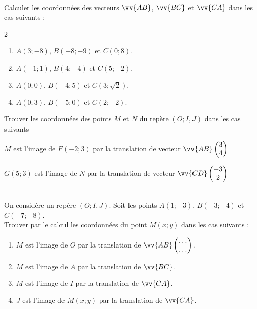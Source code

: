 \documentclass[main.tex]{subfiles}
\begin{document}
\begin{exercise}\label{chapter06:exercice:vecteurscoordonnees}\hfill \\ 
	Calculer les coordonnées des vecteurs $\vv{AB}$, $\vv{BC}$ et $\vv{CA}$  dans les cas suivants :
	\begin{multicols}{2}
		\begin{enumerate}[leftmargin=*,label=\alph*)]
			\item $A(3;-8)$, $B(-8;-9)$ et $C(0;8)$.
			\item $A(-1;1)$, $B(4;-4)$ et $C(5;-2)$.
			\item $A(0;0)$, $B(-4;5)$ et $C(3;\sqrt{2})$.
			\item $A(0;3)$, $B(-5;0)$ et $C(2;-2)$.
		\end{enumerate}
	\end{multicols}
\end{exercise}
\begin{example}Trouver les coordonnées des points $M$ et $N$ du repère $(O;I,J)$ dans les cas suivants\hfill \smallskip
	
	\noindent\parbox{0.47\linewidth}{
		$M$ est l'image de $F(-2;3)$ par la translation de vecteur $\vv{AB}\begin{pmatrix}
			3\\4
		\end{pmatrix}$
	}
	\hfill 
	\parbox{0.47\linewidth}{
		$G(5;3)$ est l'image de $N$ par la translation de vecteur $\vv{CD}\begin{pmatrix}
			-3\\2
		\end{pmatrix}$
	}	
	
	\vfill 
	
\end{example}

\begin{exercise}\label{chapter06:exercice:translationcoordonnees}\hfill \\
	On considère un repère $(O;I,J)$. Soit les points $A(1;-3)$, $B(-3;-4)$ et $C(-7;-8)$. \\
	Trouver par le calcul les coordonnées du point $M(x;y)$ dans les cas suivants : 
	\begin{enumerate}[leftmargin=*,label=\alph*)] 
		\item $M$ est l'image de $O$ par la translation de $\vv{AB}\begin{pmatrix}
			\ldots \\ \ldots
		\end{pmatrix}$. 
		\item $M$ est l'image de $A$ par la translation de $\vv{BC}$.
		\item $M$ est l'image de $I$ par la translation de $\vv{CA}$.
		\item $J$ est l'image de $M(x;y)$ par la translation de $\vv{CA}$.
	\end{enumerate} 
\end{exercise} 
\end{document}
